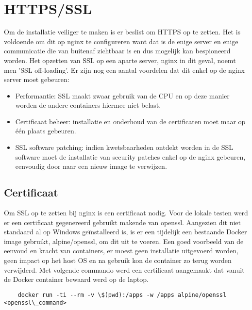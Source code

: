 \section{HTTPS/SSL}
Om de installatie veiliger te maken is er beslist om HTTPS op te zetten. Het is voldoende om dit op nginx te configureren want dat is de enige server en enige communicatie die van buitenaf zichtbaar is en dus mogelijk kan bespioneerd worden. Het opzetten van SSL op een aparte server, nginx in dit geval, noemt men 'SSL off-loading'.
\newline
Er zijn nog een aantal voordelen dat dit enkel op de nginx server moet gebeuren:
\newline
\begin{itemize}
    \item Performantie: SSL maakt zwaar gebruik van de CPU en op deze manier worden de andere containers hiermee niet belast.
    \item Certificaat beheer: installatie en onderhoud van de certificaten moet maar op \'e\'en plaats gebeuren.
    \item SSL software patching: indien kwetsbaarheden ontdekt worden in de SSL software moet de installatie van security patches enkel op de nginx gebeuren, eenvoudig door naar een nieuw image te verwijzen.
\end{itemize}



\subsection{Certificaat}
Om SSL op te zetten bij nginx is een certificaat nodig. Voor de lokale testen werd er een certificaat gegenereerd gebruikt makende van openssl. Aangezien dit niet standaard al op Windows geïnstalleerd is, is er een tijdelijk een bestaande Docker image gebruikt, alpine/openssl, om dit uit te voeren. Een goed voorbeeld van de eenvoud en kracht van containers, er moest geen installatie uitgevoerd worden, geen impact op het host OS en na gebruik kon de container zo terug worden verwijderd.
\newline
\newline
Met volgende commando werd een certificaat aangemaakt dat vanuit de Docker container bewaard werd op de laptop.
\newline
\newline
\begin{lstlisting}
    docker run -ti --rm -v \$(pwd):/apps -w /apps alpine/openssl <openssl\_command>
\end{lstlisting}

